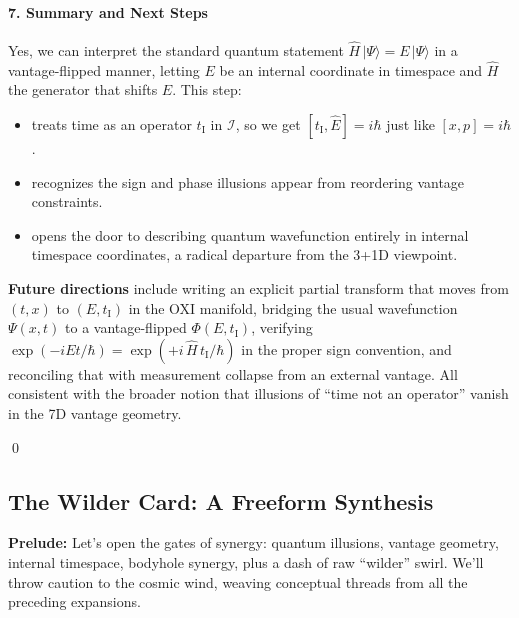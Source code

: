 \documentclass{article}
\begin{document}
\paragraph{7. Summary and Next Steps}
Yes, we can interpret the standard quantum statement $\hat{H}\,\lvert\Psi\rangle= E\,\lvert\Psi\rangle$ in a vantage-flipped manner, letting $E$ be an internal coordinate in timespace and $\hat{H}$ the generator that shifts $E$. This step:
\begin{itemize}
  \item treats time as an operator $t_{\mathrm{I}}$ in $\mathcal{I}$, so we get $[t_{\mathrm{I}},\hat{E}]=i\hbar$ just like $[x,p]=i\hbar$.\vspace{-4pt}
  \item recognizes the sign and phase illusions appear from reordering vantage constraints.\vspace{-4pt}
  \item opens the door to describing quantum wavefunction entirely in internal timespace coordinates, a radical departure from the 3+1D viewpoint.\vspace{-4pt}
\end{itemize}
\noindent\textbf{Future directions} include writing an explicit partial transform that moves from $(t,x)$ to $(E, t_{\mathrm{I}})$ in the OXI manifold, bridging the usual wavefunction $\Psi(x,t)$ to a vantage-flipped $\Phi(E,t_{\mathrm{I}})$, verifying $\exp(-iEt/\hbar)=\exp(+i\,\hat{H}\,t_{\mathrm{I}}/\hbar)$ in the proper sign convention, and reconciling that with measurement collapse from an external vantage. All consistent with the broader notion that illusions of “time not an operator” vanish in the 7D vantage geometry.

\qed




\subsection*{The Wilder Card: A Freeform Synthesis}

\noindent\textbf{Prelude:} Let’s open the gates of synergy: quantum illusions, vantage geometry, internal timespace, bodyhole synergy, plus a dash of raw “wilder” swirl. We’ll throw caution to the cosmic wind, weaving conceptual threads from all the preceding expansions.
\end{document}
